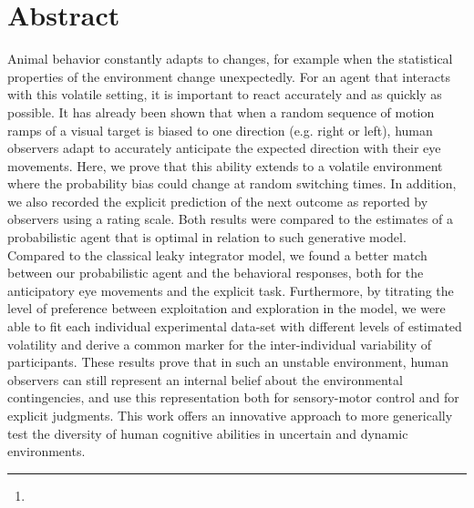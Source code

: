 \documentclass[10pt,letterpaper]{article}
\title{\Title}%
\author{\AuthorA,
\AuthorB,
\AuthorC\thanks{\Address} }
\begin{document}
%
\maketitle%
\section*{Abstract}
Animal behavior constantly adapts to changes, for example when the statistical properties of the environment change unexpectedly. For an agent that interacts with this volatile setting, it is important to react accurately and as quickly as possible. It has already been shown that when a random sequence of motion ramps of a visual target is biased to one direction (e.g. right or left), human observers adapt to accurately anticipate the expected direction with their eye movements. Here, we prove that this ability extends to a volatile environment where the probability bias could change at random switching times. In addition, we also recorded the explicit prediction of the next outcome as reported by observers using a rating scale. Both results were compared to the estimates of a probabilistic agent that is optimal in relation to such generative model. Compared to the classical leaky integrator model, we found a better match between our probabilistic agent and the behavioral responses, both for the anticipatory eye movements and the explicit task. Furthermore, by titrating the level of preference between exploitation and exploration in the model, we were able to fit each individual experimental data-set with different levels of estimated volatility and derive a common marker for the inter-individual variability of participants. These results prove that in such an unstable environment, human observers can still represent an internal belief about the environmental contingencies, and use this representation both for sensory-motor control and for explicit judgments. This work offers an innovative approach to more generically test the diversity of human cognitive abilities in uncertain and dynamic environments.
\end{document}
